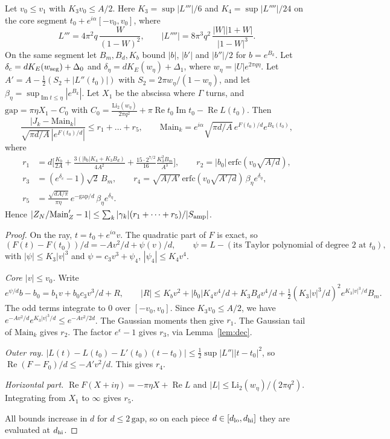 \documentclass[11pt]{article}
\theoremstyle{definition}\newtheorem{definition}[theorem]{Definition}
\theoremstyle{remark}\newtheorem{remark}[theorem]{Remark}
\begin{document}
\begin{lemma}\label{lem:lap}
Let $v_0\le v_1$ with $K_3v_0\le A/2$. Here $K_3=\sup|L'''|/6$ and $K_4=\sup|L''''|/24$ on the core segment $t_0+e^{i\alpha}[-v_0,v_0]$, where
\[L'''=4\pi^2q\,\frac{W}{(1-W)^2},\qquad |L''''|=8\pi^3q^2\,\frac{|W||1+W|}{|1-W|^3}.\]
On the same segment let $B_m,B_d,K_b$ bound $|b|$, $|b'|$ and $|b''|/2$ for $b=e^{B_k}$.
Let $\delta_c=dK_E(w_{\rm seg})+\Delta_0$ and $\delta_\eta=dK_E(w_\eta)+\Delta_1$, where $w_\eta=|U|e^{2\pi q\eta}$.
Let $A'=A-\tfrac12(S_2+|L''(t_0)|)$ with $S_2=2\pi w_\eta/(1-w_\eta)$, and let $\beta_\eta=\sup_{\operatorname{Im}t\le\eta}|e^{B_k}|$.
Let $X_1$ be the abscissa where $\Gamma$ turns, and $\mathrm{gap}=\pi\eta X_1-C_0$ with
$C_0=\frac{\mathrm{Li}_2(w_\eta)}{2\pi q^2}+\pi\operatorname{Re}t_0\operatorname{Im}t_0-\operatorname{Re}L(t_0)$. Then
\[\frac{|J_k-\mathrm{Main}_k|}{\sqrt{\pi d/A}\,|e^{F(t_0)/d}|}\le r_1+\dots+r_5,\qquad \mathrm{Main}_k=e^{i\alpha}\sqrt{\pi d/A}\,e^{F(t_0)/d}e^{B_k(t_0)},\]
where
\begin{align*}
r_1&=d\Big[\frac{K_b}{2A}+\frac{3(|b_0|K_4+K_3B_d)}{4A^2}+\frac{15\cdot2^{7/2}}{16}\frac{K_3^2B_m}{A^3}\Big],\qquad r_2=|b_0|\,\mathrm{erfc}(v_0\sqrt{A/d}),\\
r_3&=(e^{\delta_c}-1)\sqrt2\,B_m,\qquad r_4=\sqrt{A/A'}\,\mathrm{erfc}(v_0\sqrt{A'/d})\,\beta_\eta e^{\delta_\eta},\\
r_5&=\frac{\sqrt{dA/\pi}}{\pi\eta}\,e^{-\mathrm{gap}/d}\,\beta_\eta e^{\delta_\eta}.
\end{align*}
Hence $|Z_N/\mathrm{Main}'_Z-1|\le\sum_k|\gamma_k|(r_1+\dots+r_5)/|S_{\rm amp}|$.
\end{lemma}
\begin{proof}
On the ray, $t=t_0+e^{i\alpha}v$. The quadratic part of $F$ is exact, so
\[(F(t)-F(t_0))/d=-Av^2/d+\psi(v)/d,\qquad \psi=L-(\text{its Taylor polynomial of degree 2 at }t_0),\]
with $|\psi|\le K_3|v|^3$ and $\psi=c_3v^3+\psi_4$, $|\psi_4|\le K_4v^4$.

\emph{Core $|v|\le v_0$.} Write
\[e^{\psi/d}b-b_0=b_1v+b_0c_3v^3/d+R,\qquad |R|\le K_bv^2+|b_0|K_4v^4/d+K_3B_dv^4/d+\tfrac12(K_3|v|^3/d)^2e^{K_3|v|^3/d}B_m.\]
The odd terms integrate to $0$ over $[-v_0,v_0]$. Since $K_3v_0\le A/2$, we have $e^{-Av^2/d}e^{K_3|v|^3/d}\le e^{-Av^2/2d}$. The Gaussian moments then give $r_1$.
The Gaussian tail of $\mathrm{Main}_k$ gives $r_2$. The factor $e^{\epsilon}-1$ gives $r_3$, via Lemma~\ref{lem:dec}.

\emph{Outer ray.} $|L(t)-L(t_0)-L'(t_0)(t-t_0)|\le\frac12\sup|L''||t-t_0|^2$, so $\operatorname{Re}(F-F_0)/d\le-A'v^2/d$. This gives $r_4$.

\emph{Horizontal part.} $\operatorname{Re}F(X+i\eta)=-\pi\eta X+\operatorname{Re}L$ and $|L|\le\mathrm{Li}_2(w_\eta)/(2\pi q^2)$. Integrating from $X_1$ to $\infty$ gives $r_5$.

All bounds increase in $d$ for $d\le2\,\mathrm{gap}$, so on each piece $d\in[d_{\rm lo},d_{\rm hi}]$ they are evaluated at $d_{\rm hi}$.
\end{proof}
\end{document}
